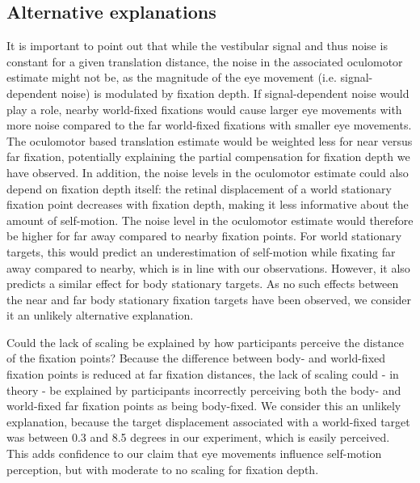 \subsection{Alternative explanations}

It is important to point out that while the vestibular signal and thus noise is constant for a given translation distance, the noise in the associated oculomotor estimate might not be, as the magnitude of the eye movement (i.e. signal-dependent noise) is modulated by fixation depth. If signal-dependent noise would play a role, nearby world-fixed fixations would cause larger eye movements with more noise compared to the far world-fixed fixations with smaller eye movements. The oculomotor based translation estimate would be weighted less for near versus far fixation, potentially explaining the partial compensation for fixation depth we have observed. In addition, the noise levels in the oculomotor estimate could also depend on fixation depth itself: the retinal displacement of a world stationary fixation point decreases with fixation depth, making it less informative about the amount of self-motion. The noise level in the oculomotor estimate would therefore be higher for far away compared to nearby fixation points. For world stationary targets, this would predict an underestimation of self-motion while fixating far away compared to nearby, which is in line with our observations. However, it also predicts a similar effect for body stationary targets. As no such effects between the near and far body stationary fixation targets have been observed, we consider it an unlikely alternative explanation.
 
Could the lack of scaling be explained by how participants perceive the distance of the fixation points? Because the difference between body- and world-fixed fixation points is reduced at far fixation distances, the lack of scaling could - in theory - be explained by participants incorrectly perceiving both the body- and world-fixed far fixation points as being body-fixed. We consider this an unlikely explanation, because the target displacement associated with a world-fixed target was between 0.3 and 8.5 degrees in our experiment, which is easily perceived. This adds confidence to our claim that eye movements influence self-motion perception, but with moderate to no scaling for fixation depth.


